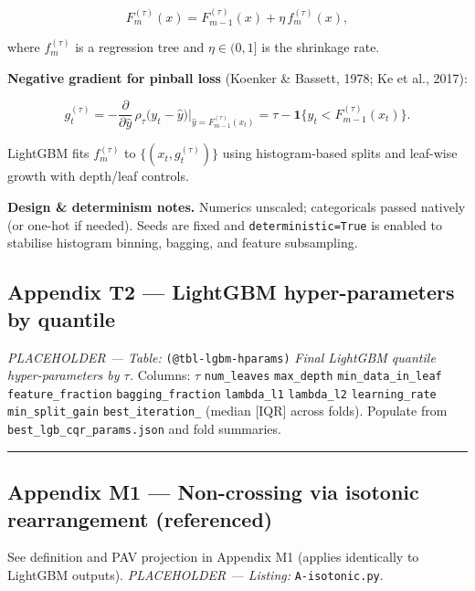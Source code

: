 \documentclass[
  a4paper,
  DIV=11,
  numbers=noendperiod]{scrreprt}
\begin{document}
\[
\label{eq-lgbm-update}
F^{(\tau)}_{m}(x)=F^{(\tau)}_{m-1}(x)+\eta\, f^{(\tau)}_m(x),
\]

where \(f^{(\tau)}_m\) is a regression tree and \(\eta\in(0,1]\) is the
shrinkage rate.

\textbf{Negative gradient for pinball loss} (Koenker \& Bassett, 1978;
Ke et al., 2017):

\[
\label{eq-lgbm-grad}
g_t^{(\tau)}
= -\frac{\partial}{\partial \hat y}\,\rho_\tau\!\big(y_t-\hat y\big)\Big|_{\hat y=F^{(\tau)}_{m-1}(x_t)}
= \tau-\mathbf{1}\{y_t<F^{(\tau)}_{m-1}(x_t)\}.
\]

LightGBM fits \(f^{(\tau)}_m\) to \(\{(x_t,g_t^{(\tau)})\}\) using
histogram-based splits and leaf-wise growth with depth/leaf controls.

\textbf{Design \& determinism notes.} Numerics unscaled; categoricals
passed natively (or one-hot if needed). Seeds are fixed and
\texttt{deterministic=True} is enabled to stabilise histogram binning,
bagging, and feature subsampling.

\subsection{Appendix T2 --- LightGBM hyper-parameters by
quantile}\label{app-t2-lgbm-hparams}

\emph{PLACEHOLDER --- Table:} \texttt{(@tbl-lgbm-hparams)} \emph{Final
LightGBM quantile hyper-parameters by \(\tau\).} Columns: \(\tau\)
\textbar{} \texttt{num\_leaves} \textbar{} \texttt{max\_depth}
\textbar{} \texttt{min\_data\_in\_leaf} \textbar{}
\texttt{feature\_fraction} \textbar{} \texttt{bagging\_fraction}
\textbar{} \texttt{lambda\_l1} \textbar{} \texttt{lambda\_l2} \textbar{}
\texttt{learning\_rate} \textbar{} \texttt{min\_split\_gain} \textbar{}
\texttt{best\_iteration\_} (median {[}IQR{]} across folds). Populate
from \texttt{best\_lgb\_cqr\_params.json} and fold summaries.

\begin{center}\rule{0.5\linewidth}{0.5pt}\end{center}

\subsection{Appendix M1 --- Non-crossing via isotonic rearrangement
(referenced)}\label{app-m1-isotonic}

See definition and PAV projection in Appendix M1 (applies identically to
LightGBM outputs). \emph{PLACEHOLDER --- Listing:}
\texttt{A-isotonic.py}.
\end{document}
